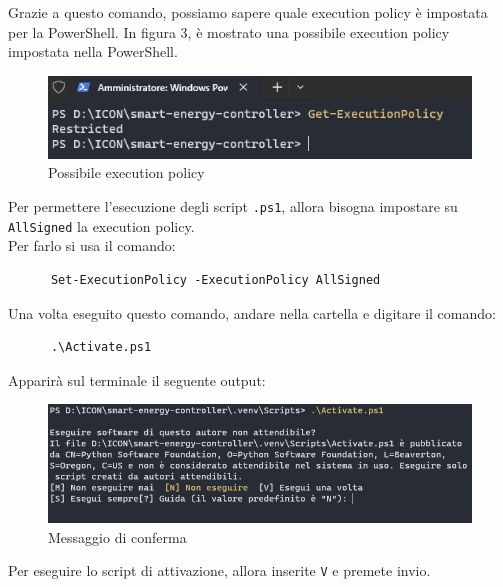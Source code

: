 \documentclass[12pt, letterpaper]{article}
\begin{document}
\noindent Grazie a questo comando, possiamo sapere quale execution policy è impostata per la PowerShell.
In figura 3, è mostrato una possibile execution policy impostata nella PowerShell. \\

\begin{figure}[h]
      \centering
      \includegraphics{powershell-error.png}
      \caption{Possibile execution policy}
\end{figure}

\noindent Per permettere l'esecuzione degli script \texttt{.ps1}, allora bisogna impostare
su \texttt{AllSigned} la execution policy. \\
\noindent Per farlo si usa il comando: \\

\begin{verbatim}
      Set-ExecutionPolicy -ExecutionPolicy AllSigned
\end{verbatim}

Una volta eseguito questo comando, andare nella cartella  e digitare il
comando:

\begin{verbatim}
      .\Activate.ps1
\end{verbatim}

Apparirà sul terminale il seguente output: \\

\begin{figure}[h]
      \centering
      \includegraphics[scale=0.6]{terminal-message.png}
      \caption{Messaggio di conferma}
\end{figure}

Per eseguire lo script di attivazione, allora inserite \texttt{V} e
premete invio. \\ \break
\end{document}
